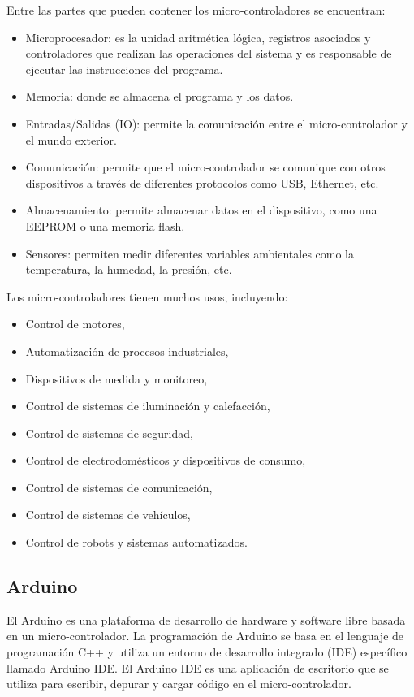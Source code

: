 Entre las partes que pueden contener los micro-controladores se encuentran: 

\begin{itemize}
    \item Microprocesador: es la unidad aritmética lógica,  registros asociados y controladores  que realizan  las operaciones del sistema y es responsable de ejecutar las instrucciones del programa.
    \item Memoria: donde se almacena el programa y los datos.
    \item Entradas/Salidas (IO): permite la comunicación entre el micro-controlador y el mundo exterior.
    \item Comunicación: permite que el micro-controlador se comunique con otros dispositivos a través de diferentes protocolos como USB, Ethernet, etc.
    \item Almacenamiento: permite almacenar datos en el dispositivo, como una EEPROM o una memoria flash.
    \item Sensores: permiten medir diferentes variables ambientales como la temperatura, la humedad, la presión, etc.
\end{itemize}

Los micro-controladores tienen muchos usos, incluyendo: 
\begin{itemize}
    \item Control de motores,
    \item Automatización de procesos industriales,
    \item Dispositivos de medida y monitoreo,
    \item Control de sistemas de iluminación y calefacción,
    \item Control de sistemas de seguridad,
    \item Control de electrodomésticos y dispositivos de consumo,
    \item Control de sistemas de comunicación,
    \item Control de sistemas de vehículos,
    \item Control de robots y sistemas automatizados.
\end{itemize}
\subsection{Arduino}

El Arduino es una plataforma de desarrollo de hardware y software libre basada en un micro-controlador. La programación de Arduino se basa en el lenguaje de programación C++ y utiliza un entorno de desarrollo integrado (IDE) específico llamado Arduino IDE. El Arduino IDE es una aplicación de escritorio que se utiliza para escribir, depurar y cargar código en el micro-controlador.

